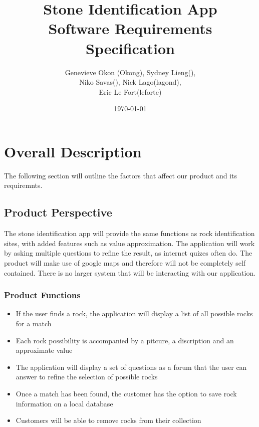 \documentclass[titlepage]{article}
\begin{document}
\title{Stone Identification App \\
	Software Requirements Specification}
\author{Genevieve Okon (Okong), Sydney Lieng(),\\
	Niko Savas(), Nick Lago(lagond),\\
	Eric Le Fort(leforte)}
\date{\today}
\maketitle



\section{Overall Description}
The following section will outline the factors that affect our product and its requiremnts.\\

\subsection{Product Perspective}
The stone identification app will provide the same functions as rock identification sites, with added features such as value approximation. The application will work by asking multiple questions to refine the result, as internet quizes often do. The product will make use of google maps and therefore will not be completely self contained. 
There is no larger system that will be interacting with our application.\\

\subsubsection{Product Functions}
\begin{itemize}

\item If the user finds a rock, the application will display a list of all possible rocks for a match \\
\item Each rock possibility is accompanied by a pitcure, a discription and an approximate value\\
\item The application will display a set of questions as a forum that the user can answer to refine the selection of possible rocks\\
\item Once a match has been found, the customer has the option to save rock information on a local database\\
\item Customers will be able to remove rocks from their collection\\



\end{itemize}
\end{document}

